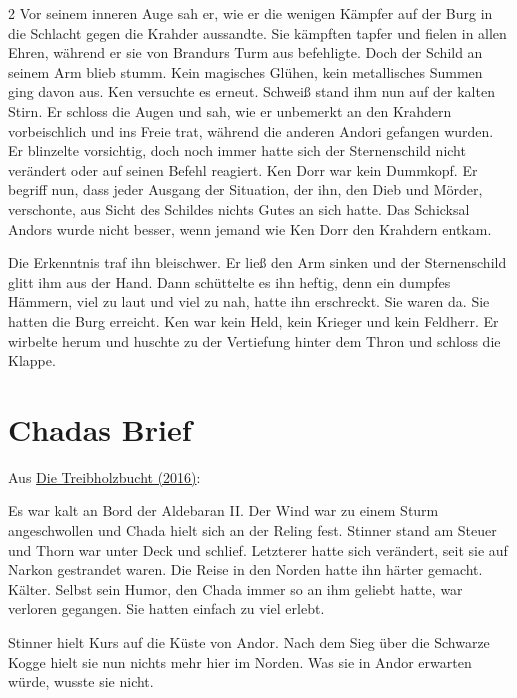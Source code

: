 \documentclass[10pt, a4paper, oneside]{book}
\newcommand{\fillbreak}{\vspace*{\fill}\columnbreak}
\begin{document}
\begin{multicols}{2}
Vor seinem inneren Auge sah er, wie er die wenigen Kämpfer auf der Burg in die Schlacht gegen die Krahder aussandte. Sie kämpften tapfer und fielen in allen Ehren, während er sie von Brandurs Turm aus befehligte. Doch der Schild an seinem Arm blieb stumm. Kein magisches Glühen, kein metallisches Summen ging davon aus. Ken versuchte es erneut. Schweiß stand ihm nun auf der kalten Stirn. Er schloss die Augen und sah, wie er unbemerkt an den Krahdern vorbeischlich und ins Freie trat, während die anderen Andori gefangen wurden. Er blinzelte vorsichtig, doch noch immer hatte sich der Sternenschild nicht verändert oder auf seinen Befehl reagiert. Ken Dorr war kein Dummkopf. Er begriff nun, dass jeder Ausgang der Situation, der ihn, den Dieb und Mörder, verschonte, aus Sicht des Schildes nichts Gutes an sich hatte. Das Schicksal Andors wurde nicht besser, wenn jemand wie Ken Dorr den Krahdern entkam. 

Die Erkenntnis traf ihn bleischwer. Er ließ den Arm sinken und der Sternenschild glitt ihm aus der Hand. Dann schüttelte es ihn heftig, denn ein dumpfes Hämmern, viel zu laut und viel zu nah, hatte ihn erschreckt. Sie waren da. Sie hatten die Burg erreicht. Ken war kein Held, kein Krieger und kein Feldherr. Er wirbelte herum und huschte zu der Vertiefung hinter dem Thron und schloss die Klappe.






\fillbreak
\section{Chadas Brief}

\begin{center}
    Aus \hyperref[legende-2016-die-treibholzbucht]{Die Treibholzbucht (2016)}:
\end{center}

Es war kalt an Bord der Aldebaran II. Der Wind war zu einem Sturm angeschwollen und Chada hielt sich an der Reling fest. Stinner stand am Steuer und Thorn war unter Deck und schlief. Letzterer hatte sich verändert, seit sie auf Narkon gestrandet waren. Die Reise in den Norden hatte ihn härter gemacht. Kälter. Selbst sein Humor, den Chada immer so an ihm geliebt hatte, war verloren gegangen. Sie hatten einfach zu viel erlebt.

Stinner hielt Kurs auf die Küste von Andor. Nach dem Sieg über die Schwarze Kogge hielt sie nun nichts mehr hier im Norden. Was sie in Andor erwarten würde, wusste sie nicht.


\end{multicols}
\end{document}
